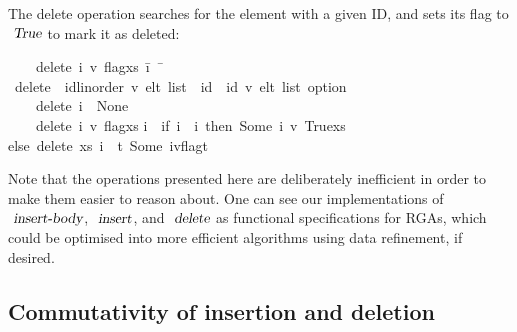 The delete operation searches for the element with a given ID, and sets its flag to $\isa{True}$ to mark it as deleted:
\begin{isabelle}
~~~~{\isachardoublequoteopen}delete\ {\isacharparenleft}{\isacharparenleft}i{\isacharprime}{\isacharcomma}\ v{\isacharcomma}\ flag{\isacharparenright}{\isacharhash}xs{\isacharparenright}\ \=i\ {\isacharequal}\ {\isacharparenleft}\=\kill
{}\ delete\ {\isacharcolon}{\isacharcolon}\ {\isachardoublequoteopen}{\isacharparenleft}{\isacharprime}id{\isacharcolon}{\isacharcolon}{\isacharbraceleft}linorder{\isacharbraceright}{\isacharcomma}\ {\isacharprime}v{\isacharparenright}\ elt\ list\ {\isasymRightarrow}\ {\isacharprime}id\ {\isasymRightarrow}\ {\isacharparenleft}{\isacharprime}id{\isacharcomma}\ {\isacharprime}v{\isacharparenright}\ elt\ list\ option{\isachardoublequoteclose}\ \\
~~~~{\isachardoublequoteopen}delete\ {\isacharbrackleft}{\isacharbrackright}\>i\ {\isacharequal}\ None{\isachardoublequoteclose}\ {\isacharbar}\\
~~~~{\isachardoublequoteopen}delete\ {\isacharparenleft}{\isacharparenleft}i{\isacharprime}{\isacharcomma}\ v{\isacharcomma}\ flag{\isacharparenright}{\isacharhash}xs{\isacharparenright} \>i\ {\isacharequal}\ {\isacharparenleft}\>if\ i{\isacharprime}\ {\isacharequal}\ i\ then\ Some\ {\isacharparenleft}{\isacharparenleft}i{\isacharprime}{\isacharcomma}\ v{\isacharcomma}\ True{\isacharparenright}{\isacharhash}xs{\isacharparenright}\\
\>\>else\ delete\ xs\ i\ {\isasymbind}\ {\isacharparenleft}{\isasymlambda}t{\isachardot}\ Some\ {\isacharparenleft}{\isacharparenleft}i{\isacharprime}{\isacharcomma}v{\isacharcomma}flag{\isacharparenright}{\isacharhash}t{\isacharparenright}{\isacharparenright}{\isacharparenright}{\isachardoublequoteclose}%
\end{isabelle}
Note that the operations presented here are deliberately inefficient in order to make them easier to reason about.
One can see our implementations of $\isa{insert-body}$, $\isa{insert}$, and $\isa{delete}$ as functional specifications for RGAs, which could be optimised into more efficient algorithms using data refinement, if desired.

\subsection{Commutativity of insertion and deletion}

